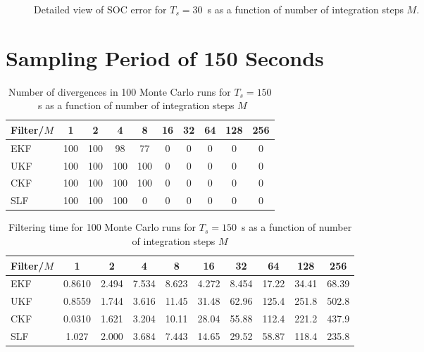 \documentclass[../zhang_thesis.tex]{subfiles}
\begin{document}
\begin{figure}[p]
\centering

\caption{Detailed view of SOC error for $T_s=30$~s as a function of number of integration steps $M$.}
\label{fig:mrmse_det_30}
\end{figure}

\clearpage

\section{Sampling Period of 150 Seconds}

\begin{table}[h]
\centering
\caption{Number of divergences in 100 Monte Carlo runs for $T_s=150$~s as a function of number of integration steps $M$}
\begin{tabular}{@{}l*{9}{c}@{}}
\toprule
Filter/$M$ & 1   & 2   & 4   & 8   & 16 & 32 & 64 & 128 & 256 \\
\midrule
EKF        & 100 & 100 & 98  & 77  & 0  & 0  & 0  & 0   & 0   \\
UKF        & 100 & 100 & 100 & 100 & 0  & 0  & 0  & 0   & 0   \\
CKF        & 100 & 100 & 100 & 100 & 0  & 0  & 0  & 0   & 0   \\
SLF        & 100 & 100 & 100 & 0   & 0  & 0  & 0  & 0   & 0   \\
\bottomrule
\end{tabular}
\label{tab:div_150}
\end{table}

\begin{table}[h]
\centering
\caption{Filtering time for 100 Monte Carlo runs for $T_s=150$~s as a function of number of integration steps $M$}
\begin{tabular}{@{}lccccccccc@{}}
\toprule
Filter/$M$ & 1      & 2     & 4     & 8     & 16    & 32    & 64    & 128   & 256   \\ \midrule
EKF        & 0.8610 & 2.494 & 7.534 & 8.623 & 4.272 & 8.454 & 17.22 & 34.41 & 68.39 \\
UKF        & 0.8559 & 1.744 & 3.616 & 11.45 & 31.48 & 62.96 & 125.4 & 251.8 & 502.8 \\
CKF        & 0.0310 & 1.621 & 3.204 & 10.11 & 28.04 & 55.88 & 112.4 & 221.2 & 437.9 \\
SLF        & 1.027  & 2.000 & 3.684 & 7.443 & 14.65 & 29.52 & 58.87 & 118.4 & 235.8 \\ \bottomrule
\end{tabular}
\label{tab:time_150}
\end{table}
\end{document}
